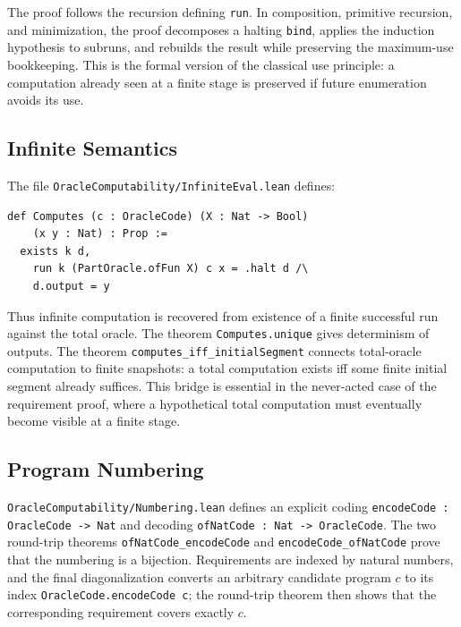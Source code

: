 The proof follows the recursion defining \texttt{run}.  In composition,
primitive recursion, and minimization, the proof decomposes a halting
\texttt{bind}, applies the induction hypothesis to subruns, and rebuilds
the result while preserving the maximum-use bookkeeping.  This is the
formal version of the classical use principle: a computation already seen
at a finite stage is preserved if future enumeration avoids its use.

\subsection{Infinite Semantics}

The file \texttt{OracleComputability/InfiniteEval.lean} defines:

\begin{lstlisting}
def Computes (c : OracleCode) (X : Nat -> Bool)
    (x y : Nat) : Prop :=
  exists k d,
    run k (PartOracle.ofFun X) c x = .halt d /\
    d.output = y
\end{lstlisting}

Thus infinite computation is recovered from existence of a finite
successful run against the total oracle.  The theorem
\texttt{Computes.unique} gives determinism of outputs.  The theorem
\texttt{computes_iff_initialSegment} connects total-oracle computation to
finite snapshots: a total computation exists iff some finite initial
segment already suffices.  This bridge is essential in the never-acted case
of the requirement proof, where a hypothetical total computation must
eventually become visible at a finite stage.

\subsection{Program Numbering}

\texttt{OracleComputability/Numbering.lean} defines an explicit coding
\texttt{encodeCode : OracleCode -> Nat} and decoding
\texttt{ofNatCode : Nat -> OracleCode}.  The two round-trip theorems
\texttt{ofNatCode_encodeCode} and \texttt{encodeCode_ofNatCode} prove that
the numbering is a bijection.  Requirements are indexed by natural numbers,
and the final diagonalization converts an arbitrary candidate program
\(c\) to its index \texttt{OracleCode.encodeCode c}; the round-trip theorem
then shows that the corresponding requirement covers exactly \(c\).


